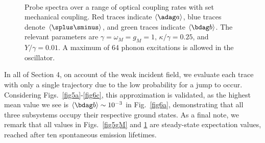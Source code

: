 \begin{figure}[htb]
\centering
{}
\\
\qquad
{}
\caption[Probe spectra over a range of optical coupling rates]{\small{Probe spectra over a range of optical coupling rates with set mechanical coupling. Red traces indicate $\langle \adag a \rangle$, blue traces denote $\langle \splus\sminus \rangle$, and green traces indicate $\langle \bdag b \rangle$. The relevant parameters are $\gamma = \omega_M = g_M = 1$, $\kappa/\gamma = 0.25$, and $Y/\gamma = 0.01$. A maximum of 64 phonon excitations is allowed in the oscillator.}}
\label{fig6g}
\end{figure}

In all of Section 4, on account of the weak incident field, we evaluate each trace with only a single trajectory due to the low probability for a jump to occur. Considering Figs.~\ref{fig5a}-\ref{fig6c}, this approximation is validated, as the highest mean value we see is $\langle \bdag b \rangle \sim 10^{-3}$ in Fig.~\ref{fig6a}, demonstrating that all three subsystems occupy their respective ground states. As a final note, we remark that all values in Figs.~\ref{fig5gM} and \ref{fig6g} are steady-state expectation values, reached after ten spontaneous emission lifetimes.

